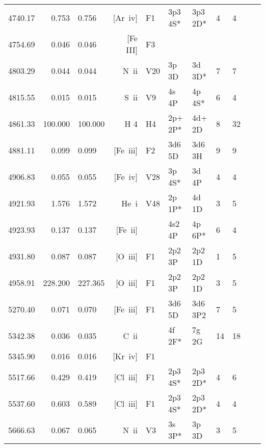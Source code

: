 \begin{longtable}{lrlrlllllll}
 4740.17 &   0.753 &   0.756 &  [Ar~{\sc iv}]   &  F1        &  3p3 4S*   &  3p3 2D*   &          4 &        4    \\
 4754.69 &   0.046 &   0.046 &  [Fe III]  &  F3        &            &            &            &                   \\
 4803.29 &   0.044 &   0.044 &  N~{\sc ii}      &  V20       &  3p 3D     &  3d 3D*    &          7 &        7    \\
 4815.55 &   0.015 &   0.015 &  S~{\sc ii}      &  V9        &  4s 4P     &  4p 4S*    &          6 &        4    \\
 4861.33 & 100.000 & 100.000 &  H 4       &  H4        &  2p+ 2P*   &  4d+ 2D    &          8 &       32          \\
 4881.11 &   0.099 &   0.099 &  [Fe~{\sc iii}]  &  F2        &  3d6 5D    &  3d6 3H    &          9 &        9    \\
 4906.83 &   0.055 &   0.055 &  [Fe~{\sc iv}]   &  V28       &  3p 4S*    &  3d 4P     &          4 &        4    \\
 4921.93 &   1.576 &   1.572 &  He~{\sc i}      &  V48       &  2p 1P*    &  4d 1D     &          3 &        5    \\
 4923.93 &   0.137 &   0.137 &  [Fe~{\sc ii}]   &            &  4s2 4P    &  4p 6P*    &          6 &        4    \\
 4931.80 &   0.087 &   0.087 &  [O~{\sc iii}]   &  F1        &  2p2 3P    &  2p2 1D    &          1 &        5    \\
 4958.91 & 228.200 & 227.365 &  [O~{\sc iii}]   &  F1        &  2p2 3P    &  2p2 1D    &          3 &        5    \\
 5270.40 &   0.071 &   0.070 &  [Fe~{\sc iii}]  &  F1        &  3d6 5D    &  3d6 3P2   &          7 &        5    \\
 5342.38 &   0.036 &   0.035 &  C~{\sc ii}      &            &  4f 2F*    &  7g 2G     &         14 &       18    \\
 5345.90 &   0.016 &   0.016 &  [Kr~{\sc iv}]   &  F1        &            &            &            &             \\
 5517.66 &   0.429 &   0.419 &  [Cl~{\sc iii}]  &  F1        &  2p3 4S*   &  2p3 2D*   &          4 &        6    \\
 5537.60 &   0.603 &   0.589 &  [Cl~{\sc iii}]  &  F1        &  2p3 4S*   &  2p3 2D*   &          4 &        4    \\
 5666.63 &   0.067 &   0.065 &  N~{\sc ii}      &  V3        &  3s 3P*    &  3p 3D     &          3 &        5    \\

\end{longtable}
